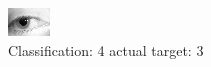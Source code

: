 \begin{figure}[h!]
\begin{center}
\includegraphics[width=0.60\columnwidth]{figures/ID1391_class_4_target_3.png}
\end{center}
\caption{ Classification: 4 actual target: 3}
\label{fig:ID1391_class_4_target_3}
\end{figure}
